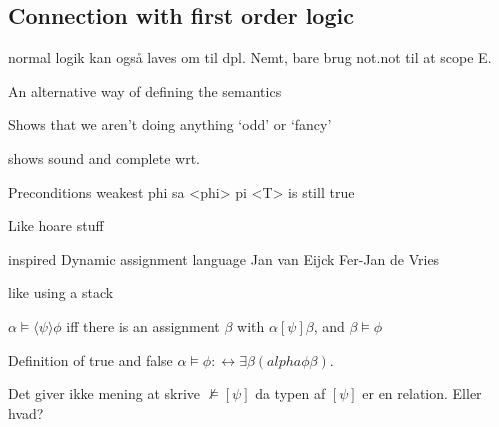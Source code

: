 \documentclass[12pt]{article}
\begin{document}
\subsection{Connection with first order logic}

normal logik kan også laves om til dpl. Nemt, bare brug not.not til at scope E.

An alternative way of defining the semantics

Shows that we aren't doing anything `odd' or `fancy'

shows sound and complete wrt.

Preconditions
weakest phi sa <phi> pi <T> is still true

Like hoare stuff

inspired Dynamic assignment language \cite{eijck1992dynamic}
Jan van Eijck 
Fer-Jan de Vries 

like using a stack

$\alpha \models \langle\psi\rangle\phi$ iff there is an assignment $\beta$ with $\alpha[\psi]\beta$, and $\beta \models \phi$

Definition of true and false $\alpha\models\phi :\leftrightarrow \exists\beta(alpha\phi\beta)$.



%

Det giver ikke mening at skrive $\not\models[\psi]$ da typen af $[\psi]$ er en relation. Eller hvad?
\end{document}
